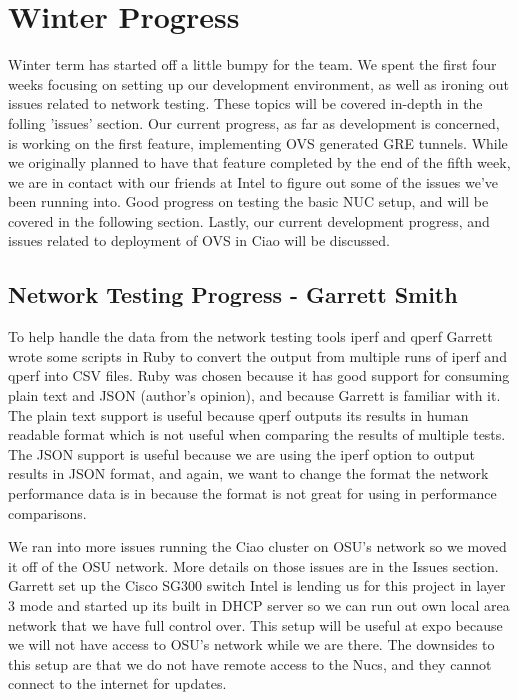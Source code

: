 \documentclass[10pt,onecolumn,journal,draftclsnofoot]{IEEEtran}
\begin{document}
\section{Winter Progress}
Winter term has started off a little bumpy for the team. We spent the first four
weeks focusing on setting up our development environment, as well as ironing out
issues related to network testing. These topics will be covered in-depth in the
folling 'issues' section. Our current progress, as far as development is
concerned, is working on the first feature, implementing OVS generated GRE
tunnels. While we originally planned to have that feature completed by the end
of the fifth week, we are in contact with our friends at Intel to figure out
some of the issues we've been running into. Good progress on testing the basic
NUC setup, and will be covered in the following section. Lastly, our current
development progress, and issues related to deployment of OVS in Ciao will be
discussed.

\subsection{Network Testing Progress - Garrett Smith}
To help handle the data from the network testing tools iperf and qperf Garrett
wrote some scripts in Ruby to convert the output from multiple runs of iperf and
qperf into CSV files. Ruby was chosen because it has good support for consuming
plain text and JSON (author's opinion), and because Garrett is familiar with it.
The plain text support is useful because qperf outputs its results in human
readable format which is not useful when comparing the results of multiple
tests.  The JSON support is useful because we are using the iperf option to
output results in JSON format, and again, we want to change the format the
network performance data is in because the format is not great for using in
performance comparisons.

We ran into more issues running the Ciao cluster on OSU's network so we moved it
off of the OSU network. More details on those issues are in the Issues section.
Garrett set up the Cisco SG300 switch Intel is lending us for this project in
layer 3 mode and started up its built in DHCP server so we can run out own local
area network that we have full control over.  This setup will be useful at expo
because we will not have access to OSU's network while we are there.  The
downsides to this setup are that we do not have remote access to the Nucs, and
they cannot connect to the internet for updates.
\end{document}
